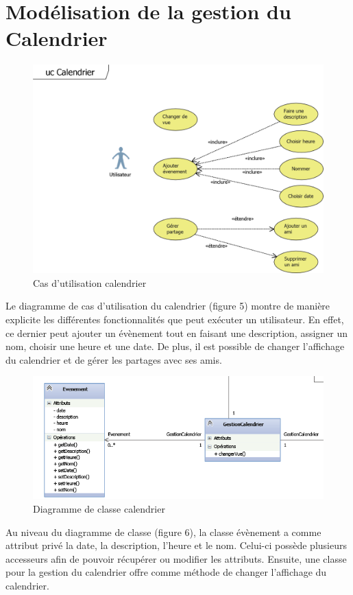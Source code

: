 \documentclass[11pt]{article}
\begin{document}
\newpage
\section{Modélisation de la gestion du Calendrier}
\begin{figure}[!h]
        \centering \includegraphics[scale=1]{ucCal.png}
        \caption{Cas d'utilisation calendrier}
         \label{fig:ucCal}
\end{figure}
Le diagramme de cas d’utilisation du calendrier (figure 5) montre de manière explicite les différentes fonctionnalités que peut exécuter un utilisateur. En effet, ce dernier peut ajouter un évènement tout en faisant une description, assigner un nom, choisir une heure et une date. De plus, il est possible de changer l’affichage du calendrier et de gérer les partages avec ses amis.
 \begin{figure}[!h]
        \centering \includegraphics[scale=1]{calendrier.png}
        \caption{Diagramme de classe calendrier}
         \label{fig:cal}
\end{figure}
Au niveau du diagramme de classe (figure 6), la classe évènement a comme attribut privé la date, la description, l’heure et le nom. Celui-ci possède plusieurs accesseurs afin de pouvoir récupérer ou modifier les attributs.  Ensuite, une classe pour la gestion du calendrier offre comme méthode de changer l’affichage du calendrier.
\end{document}
